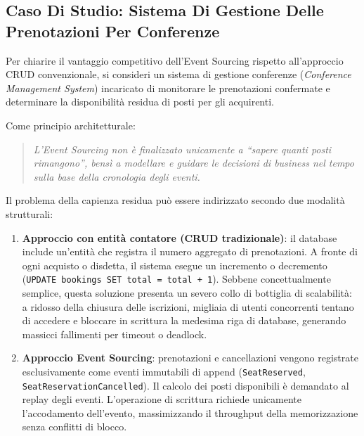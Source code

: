 \documentclass[11pt, a4paper]{article}
\begin{document}
\subsection{Caso Di Studio: Sistema Di Gestione Delle Prenotazioni Per Conferenze}

Per chiarire il vantaggio competitivo dell'Event Sourcing rispetto all'approccio CRUD convenzionale, si consideri un sistema di gestione conferenze (\emph{Conference Management System}) incaricato di monitorare le prenotazioni confermate e determinare la disponibilità residua di posti per gli acquirenti.

Come principio architetturale:
\begin{quote}
\emph{L'Event Sourcing non è finalizzato unicamente a ``sapere quanti posti rimangono'', bensì a modellare e guidare le decisioni di business nel tempo sulla base della cronologia degli eventi.}
\end{quote}

Il problema della capienza residua può essere indirizzato secondo due modalità strutturali:
\begin{enumerate}
    \item \textbf{Approccio con entità contatore (CRUD tradizionale)}: il database include un'entità che registra il numero aggregato di prenotazioni. A fronte di ogni acquisto o disdetta, il sistema esegue un incremento o decremento (\texttt{UPDATE bookings SET total = total + 1}). Sebbene concettualmente semplice, questa soluzione presenta un severo collo di bottiglia di scalabilità: a ridosso della chiusura delle iscrizioni, migliaia di utenti concorrenti tentano di accedere e bloccare in scrittura la medesima riga di database, generando massicci fallimenti per timeout o deadlock.
    \item \textbf{Approccio Event Sourcing}: prenotazioni e cancellazioni vengono registrate esclusivamente come eventi immutabili di append (\texttt{SeatReserved}, \texttt{SeatReservationCancelled}). Il calcolo dei posti disponibili è demandato al replay degli eventi. L'operazione di scrittura richiede unicamente l'accodamento dell'evento, massimizzando il throughput della memorizzazione senza conflitti di blocco.
\end{enumerate}

\end{document}
